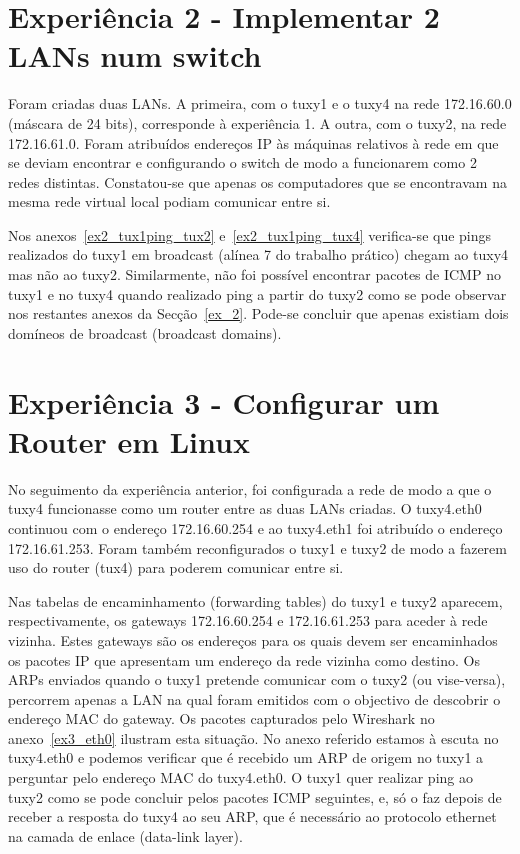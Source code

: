 \documentclass[11pt,a4paper,reqno]{report}
\numberwithin{equation}{section}
\begin{document}
\section{Experiência 2 - Implementar 2 LANs num switch}

Foram criadas duas LANs. A primeira, com o tuxy1 e o tuxy4 na rede 172.16.60.0 (máscara de 24 bits), corresponde à experiência 1. A outra, com o tuxy2, na rede 172.16.61.0. Foram atribuídos endereços IP às máquinas relativos à rede em que se deviam encontrar e configurando o switch de modo a funcionarem como 2 redes distintas. Constatou-se que apenas os computadores que se encontravam na mesma rede virtual local podiam comunicar entre si. 

Nos anexos~\ref{ex2_tux1ping_tux2} e~\ref{ex2_tux1ping_tux4} verifica-se que pings realizados do tuxy1 em broadcast (alínea 7 do trabalho prático) chegam ao tuxy4 mas não ao tuxy2. Similarmente, não foi possível encontrar pacotes de ICMP no tuxy1 e no tuxy4 quando realizado ping a partir do tuxy2 como se pode observar nos restantes anexos da Secção~\ref{ex_2}. Pode-se concluir que apenas existiam dois domíneos de broadcast (broadcast domains).

\section{Experiência 3 - Configurar um Router em Linux}

No seguimento da experiência anterior, foi configurada a rede de modo a que o tuxy4 funcionasse como um router entre as duas LANs criadas. O tuxy4.eth0 continuou com o endereço 172.16.60.254 e ao tuxy4.eth1 foi atribuído o endereço 172.16.61.253. Foram também reconfigurados o tuxy1 e tuxy2 de modo a fazerem uso do router (tux4) para poderem comunicar entre si.

Nas tabelas de encaminhamento (forwarding tables) do tuxy1 e tuxy2 aparecem, respectivamente, os gateways 172.16.60.254 e 172.16.61.253 para aceder à rede vizinha. Estes gateways são os endereços para os quais devem ser encaminhados os pacotes IP que apresentam um endereço da rede vizinha como destino. Os ARPs enviados quando o tuxy1 pretende comunicar com o tuxy2 (ou vise-versa), percorrem apenas a LAN na qual foram emitidos com o objectivo de descobrir o endereço MAC do gateway. Os pacotes capturados pelo Wireshark no anexo~\ref{ex3_eth0} ilustram esta situação. No anexo referido estamos à escuta no tuxy4.eth0 e podemos verificar que é recebido um ARP de origem no tuxy1 a perguntar pelo endereço MAC do tuxy4.eth0. O tuxy1 quer realizar ping ao tuxy2 como se pode concluir pelos pacotes ICMP seguintes, e, só o faz depois de receber a resposta do tuxy4 ao seu ARP, que é necessário ao protocolo ethernet na camada de enlace (data-link layer).
\end{document}
